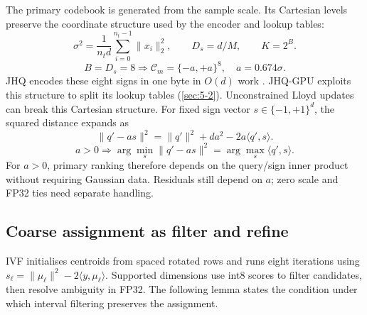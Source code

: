 The primary codebook is generated from the sample scale. Its Cartesian
levels preserve the coordinate structure used by the encoder and lookup
tables:
\begin{equation}
 \sigma^2=\frac{1}{n_t d}\sum_{i=0}^{n_t-1}\|x_i\|_2^2,
 \qquad D_s=d/M,\qquad K=2^B.
 \label{eq:4-scale}
\end{equation}
\[
 B=D_s=8\Longrightarrow
 \mathcal C_m=\{-a,+a\}^{8},\quad a=0.674\sigma.
\]
JHQ encodes these eight signs in one byte in $O(d)$ work \cite{jhq}.
JHQ-GPU exploits this structure to split its lookup tables
(\cref{sec:5-2}). Unconstrained Lloyd updates can break this
Cartesian structure. For fixed sign vector $s\in\{-1,+1\}^d$, the
squared distance expands as
\begin{equation}
 \|q'-a s\|^2=\|q'\|^2+da^2-2a\langle q',s\rangle.
 \label{eq:4-sign-ranking}
\end{equation}
\[
 a>0\Longrightarrow
 \arg\min_s\|q'-as\|^2=\arg\max_s\langle q',s\rangle.
\]
For $a>0$, primary ranking therefore depends on the query/sign inner
product without requiring Gaussian data. Residuals still depend on $a$;
zero scale and FP32 ties need separate handling.

\subsection{Coarse assignment as filter and refine}

IVF initialises centroids from spaced rotated rows and runs eight
iterations using $s_\ell=\|\mu_\ell\|^2-2\langle y,\mu_\ell\rangle$.
Supported dimensions use int8 scores to filter candidates, then resolve
ambiguity in FP32. The following lemma states the condition under which
interval filtering preserves the assignment.

